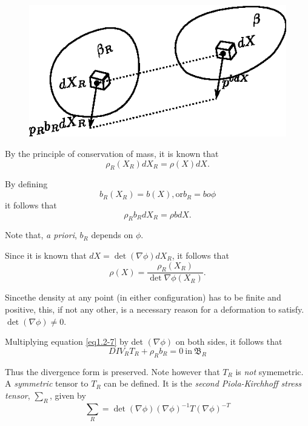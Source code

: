 \begin{figure}[H]
\centering
\includegraphics{vol71-figures/fig1.2-4.eps}
\medskip
\caption{}\label{fig1.2.4}
\end{figure}

By the principle of conservation of mass, it is known that 
$$
\rho_R(X_R) dX_R = \rho(X) dX.
$$

By defining
\begin{equation*}
b_R(X_R) = b(X), \text{or} b_R = b o \phi \tag{1.2-15}\label{eq1.2-15}
\end{equation*}
it follows that
$$
\rho_R b_R dX_R = \rho b dX.
$$

Note that, \textit{a priori}, $b_R$ depends on $\phi$.

\begin{remark}\label{chap1-rem1.2.3}%
Since it is known that $dX = \det (\nabla  \phi) dX_R$, it follows that
\begin{equation*}
  \rho(X) = \frac{\rho_R (X_R)}{\det \nabla
    \phi(X_R)}.\tag{1.2-16}\label{eq1.2-16} 
\end{equation*}
\end{remark}

Since\pageoriginale  the density at any point (in either
configuration) has to be 
finite and positive, this, if not any other, is a necessary reason for
a deformation to satisfy. $\det (\nabla  \phi) \neq 0$. 

Multiplying equation \eqref{eq1.2-7} by det $(\nabla  \phi)$ on both
sides, it follows that 
\begin{equation*}
DIV_R T_R + \rho_R b_R = 0 ~\text{in}~
\mathfrak{B}_R\tag{1.2-17}\label{eq1.2-17}
\end{equation*}

Thus the divergence form is preserved. Note however that $T_R$ is
\textit{not} symemetric. A \textit{symmetric} tensor to $T_R$ can be
defined. It is the \textit{second Piola-Kirchhoff stress
  tensor}, $\sum_R$, given by  
\begin{equation*}
\sum_R = \det (\nabla  \phi) (\nabla  \phi)^{-1}
T(\nabla  \phi)^{-T}\tag{1.2-18} \label{eq1.2-18}
\end{equation*}

